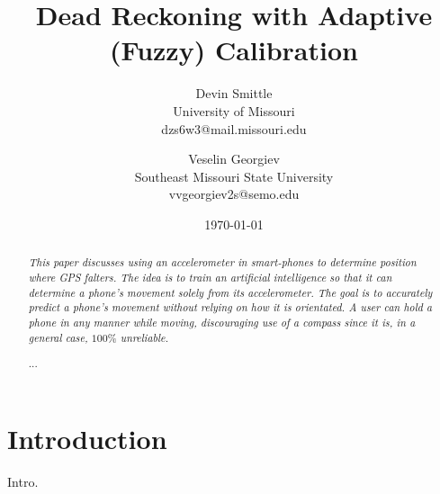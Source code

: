 \documentclass[twocolumn, draft]{article}
\begin{document}
\title{Dead Reckoning with Adaptive (Fuzzy) Calibration}
\author{ Devin Smittle \\ University of Missouri \\
  dzs6w3@mail.missouri.edu \and Veselin Georgiev \\ Southeast Missouri
State University \\ vvgeorgiev2s@semo.edu} \date{\today}
\maketitle

\begin{abstract}
  \emph{This paper discusses using an accelerometer in smart-phones to
  determine position where GPS falters. The idea is to train an
  artificial intelligence so that it can determine a phone's movement
  solely from its accelerometer. The goal is to accurately predict a
  phone's movement without relying on how it is orientated. A user can
  hold a phone in any manner while moving, discouraging use of a
  compass since it is, in a general case, $100\%$ unreliable.}

  ...
\end{abstract}

\section{Introduction}
Intro.

\end{document}
